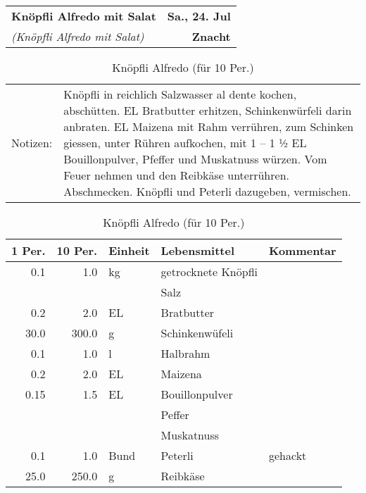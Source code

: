 \documentclass[11pt,a4paper]{article}%
\begin{document}
%
\clearpage%
\pagebreak%
\renewcommand{\arraystretch}{1.75}%
%
%


\begin{table}%
\begin{tabularx}{\textwidth}{X r}%
\LARGE \textbf{Knöpfli Alfredo mit Salat}&\color{gray} \large \textbf{Sa., 24. Jul}\\%
\small \textit{(Knöpfli Alfredo mit Salat)}&\color{gray} \large \textbf{Znacht}\\%
\hline%
\end{tabularx}%
\end{table}

%
%
\vspace{0.75cm}%
\renewcommand{\arraystretch}{1.25}%


\begin{table}[h]%
\caption{Knöpfli Alfredo (für 10 Per.)}%
\begin{tabularx}{\textwidth}{l X}%
Notizen:&Knöpfli in reichlich Salzwasser al dente kochen, abschütten.\newline%
2 EL Bratbutter erhitzen, Schinkenwürfeli darin anbraten. \newline%
2 EL Maizena mit Rahm verrühren, zum Schinken giessen, unter Rühren aufkochen, mit 1 – 1 ½ EL Bouillonpulver, Pfeffer und Muskatnuss würzen. Vom Feuer nehmen und den Reibkäse unterrühren. Abschmecken. Knöpfli und Peterli dazugeben, vermischen.\\%
\end{tabularx}%
\par%
\begin{tabularx}{\textwidth}{| r | r | l | l | X |}%
\hline%
\tiny{1 Per.}&\tiny{10 Per.}&\tiny{Einheit}&\tiny{Lebensmittel}&\tiny{Kommentar}\\%
\hline%
0.1&1.0&kg&getrocknete Knöpfli&\\%
\hline%
&&&Salz&\\%
\hline%
0.2&2.0&EL&Bratbutter&\\%
\hline%
30.0&300.0&g&Schinkenwüfeli&\\%
\hline%
0.1&1.0&l&Halbrahm&\\%
\hline%
0.2&2.0&EL&Maizena&\\%
\hline%
0.15&1.5&EL&Bouillonpulver&\\%
\hline%
&&&Peffer&\\%
\hline%
&&&Muskatnuss &\\%
\hline%
0.1&1.0&Bund&Peterli&gehackt\\%
\hline%
25.0&250.0&g&Reibkäse&\\%
\hline%
\end{tabularx}%
\end{table}
\end{document}
